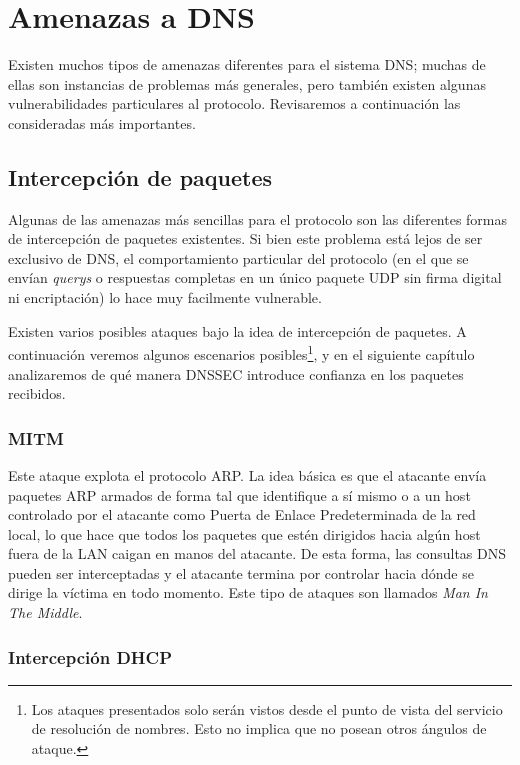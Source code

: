 \chapter{Amenazas a DNS}

Existen muchos tipos de amenazas diferentes para el sistema DNS; muchas de ellas son instancias de problemas m\'as generales, pero tambi\'en existen algunas vulnerabilidades particulares al protocolo. Revisaremos a continuaci\'on las consideradas m\'as importantes\cite{rfc3833}.

\section{Intercepci\'on de paquetes}

Algunas de las amenazas m\'as sencillas para el protocolo son las diferentes formas de intercepci\'on de paquetes existentes. Si bien este problema est\'a lejos de ser exclusivo de DNS, el comportamiento particular del protocolo (en el que se env\'ian \textit{querys} o respuestas completas en un \'unico paquete UDP sin firma digital ni encriptaci\'on) lo hace muy facilmente vulnerable. 

Existen varios posibles ataques bajo la idea de intercepci\'on de paquetes. A continuaci\'on veremos algunos escenarios posibles\footnote{Los ataques presentados solo ser\'an vistos desde el punto de vista del servicio de resoluci\'on de nombres. Esto no implica que no posean otros \'angulos de ataque.}, y en el siguiente cap\'itulo analizaremos de qu\'e manera DNSSEC introduce confianza en los paquetes recibidos.

\subsection{MITM}

Este ataque explota el protocolo ARP. La idea b\'asica es que el atacante env\'ia paquetes ARP armados de forma tal que identifique a s\'i mismo o a un host controlado por el atacante como Puerta de Enlace Predeterminada de la red local, lo que hace que todos los paquetes que est\'en dirigidos hacia alg\'un host fuera de la LAN caigan en manos del atacante. De esta forma, las consultas DNS pueden ser interceptadas y el atacante termina por controlar hacia d\'onde se dirige la v\'ictima en todo momento. Este tipo de ataques son llamados \textit{Man In The Middle}.

\subsection{Intercepci\'on DHCP}

